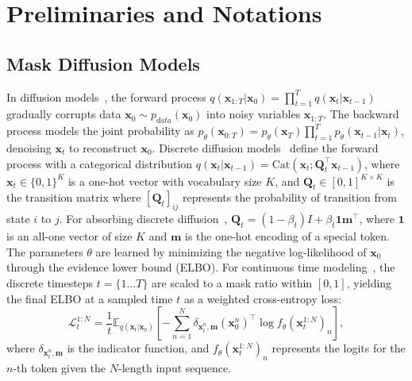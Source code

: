 \section{Preliminaries and Notations}

\subsection{Mask Diffusion Models}
In diffusion models~\citep{ho2020denoising,song2021scorebased}, the forward process $q(\bm{x}_{1:T}|\bm{x}_0)=\prod_{t=1}^{T}q(\bm{x}_t|\bm{x}_{t-1})$ gradually corrupts data $\bm{x}_0\sim p_{data}(\bm{x}_0)$ into noisy variables $\bm{x}_{1:T}$. The backward process models the joint probability as $p_{\theta}(\bm{x}_{0:T})=p_{\theta}(\bm{x}_T)\prod_{t=1}^Tp_{\theta}(\bm{x}_{t-1}|\bm{x}_t)$, denoising $\bm{x}_t$ to reconstruct $\bm{x}_0$. 
Discrete diffusion models~\citep{hoogeboom2021argmax, Zheng2023ARD} define the forward process with a categorical distribution $q(\bm{x}_{t} \vert \bm{x}_{t-1})=\text{Cat}(\bm{x}_t;\bm{Q}_t^\top\bm{x}_{t-1})$, where $\bm{x}_t \in \{0, 1\}^K$ is a one-hot vector with vocabulary size $K$, and $\bm{Q}_t\in[0,1]^{K\times K}$ is the transition matrix where $[\bm{Q}_t]_{ij}$ represents the probability of transition from state $i$ to $j$. For absorbing discrete diffusion~\citep{austin2021structured}, $\bm{Q}_t=(1-\beta_t)I+\beta_t\mathbf{1}\bm{m}^\top$, where $\mathbf{1}$ is an all-one vector of size $K$ and $\bm{m}$ is the one-hot encoding of a special \mask token.
The parameters $\theta$ are learned by minimizing the negative log-likelihood of $\bm{x}_0$ through the evidence lower bound (ELBO). For continuous time modeling~\citep{shi2024simplified,sahoo2024simple}, the discrete timesteps $t=\{1\dots T\}$ are scaled to a mask ratio within $[0,1]$, yielding the final ELBO at a sampled time $t$ as a weighted cross-entropy loss:
\begin{equation}
    \label{eq:dm-loss}
        \mathcal{L}_{t}^{1:N} = \frac{1}{t}\mathbb{E}_{q(\bm{x}_t|\bm{x}_0)}\left[-\sum_{n=1}^N\delta_{\bm{x}_t^n,\bm{m}}(\bm{x}_0^{n})^\top\log f_{\theta}(\bm{x}_t^{1:N})_n\right],
\end{equation}
where $\delta_{\bm{x}_t^n,\bm{m}}$ is the indicator function, and $f_{\theta}(\bm{x}_t^{1:N})_n$ represents the logits for the $n$-th token given the $N$-length input sequence.

